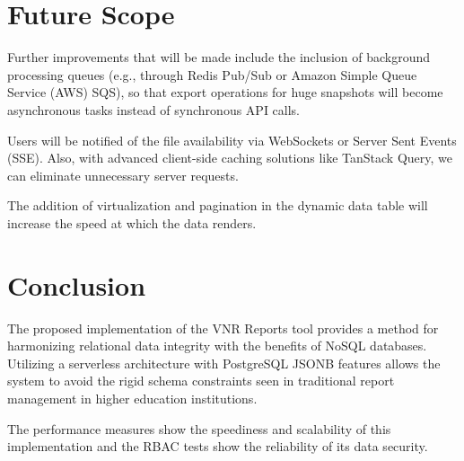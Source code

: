 \documentclass[conference]{IEEEtran}
\begin{document}
\section{Future Scope}
Further improvements that will be made include the inclusion of background processing queues (e.g., through Redis Pub/Sub or Amazon Simple Queue Service (AWS) SQS), so that export operations for huge snapshots will become asynchronous tasks instead of synchronous API calls.

Users will be notified of the file availability via WebSockets or Server Sent Events (SSE). Also, with advanced client-side caching solutions like TanStack Query, we can eliminate unnecessary server requests.

The addition of virtualization and pagination in the dynamic data table will increase the speed at which the data renders.

\section{Conclusion}
The proposed implementation of the VNR Reports tool provides a method for harmonizing relational data integrity with the benefits of NoSQL databases. Utilizing a serverless architecture with PostgreSQL JSONB features allows the system to avoid the rigid schema constraints seen in traditional report management in higher education institutions.

The performance measures show the speediness and scalability of this implementation and the RBAC tests show the reliability of its data security.
\end{document}
